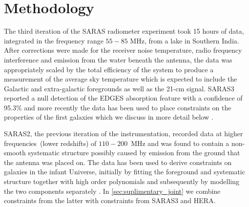 \section{Methodology} \label{sec:method_joint}

The third iteration of the SARAS radiometer experiment took 15 hours of data, integrated in the frequency range $55 - 85$ MHz, from a lake in Southern India. After corrections were made for the receiver noise temperature, radio frequency interference and emission from the water beneath the antenna, the data was appropriately scaled by the total efficiency of the system to produce a measurement of the average sky temperature which is expected to include the Galactic and extra-galactic foregrounds as well as the 21-cm signal. SARAS3 reported a null detection of the EDGES absorption feature with a confidence of 95.3\% \cite{SARAS3} and more recently the data has been used to place constraints on the properties of the first galaxies which we discuss in more detail below \citep[\cref{ch:saras3},][]{Bevins_saras3_2022}.

SARAS2, the previous iteration of the instrumentation, recorded data at higher frequencies~(lower redshifts) of $110 - 200$~MHz and was found to contain a non-smooth systematic structure possibly caused by emission from the ground that the antenna was placed on. The data has been used to derive constraints on galaxies in the infant Universe, initially by fitting the foreground and systematic structure together with high order polynomials \cite{Singh_saras2_2017, Singh_saras2_2018} and subsequently by modelling the two components separately \citep[\cref{ch:saras2},][]{Bevins_SARAS2_2022}. In \cref{sec:suplimentary_joint} we combine constraints from the latter with constraints from SARAS3 and HERA.

